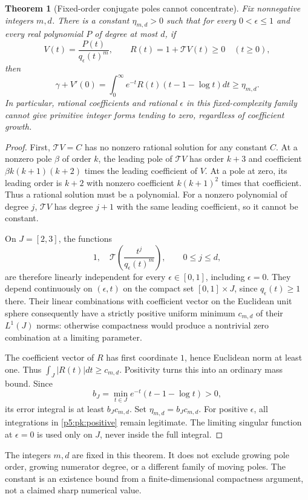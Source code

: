 \documentclass[11pt,a4paper]{article}
\newtheorem{theorem}{Theorem}[section]
\theoremstyle{definition}
\theoremstyle{remark}
\numberwithin{equation}{section}
\begin{document}
\begin{theorem}[Fixed-order conjugate poles cannot concentrate]
\label{p5:pk:fixed-moving}
Fix nonnegative integers $m,d$. There is a constant $\eta_{m,d}>0$
such that for every $0<\epsilon\le1$ and every real polynomial $P$
of degree at most $d$, if
\[
 V(t)=\frac{P(t)}{q_\epsilon(t)^m},\qquad
 R(t)=1+\mathcal T V(t)\ge0\quad(t\ge0),
\]
then
\[
 \gamma+V'(0)
 =\int_0^\infty e^{-t}R(t)(t-1-\log t)dt\ge\eta_{m,d}.
\]
In particular, rational coefficients and rational $\epsilon$ in this
fixed-complexity family cannot give primitive integer forms tending to
zero, regardless of coefficient growth.
\end{theorem}
\begin{proof}
First, $\mathcal T V=C$ has no nonzero rational solution for any constant
$C$. At a nonzero pole $\beta$ of order $k$, the leading pole of
$\mathcal T V$ has order $k+3$ and coefficient
$\beta k(k+1)(k+2)$ times the leading coefficient of $V$. At a pole at
zero, its leading order is $k+2$ with nonzero coefficient
$k(k+1)^2$ times that coefficient. Thus a rational solution must be a
polynomial. For a nonzero polynomial of degree $j$, $\mathcal T V$ has
degree $j+1$ with the same leading coefficient, so it cannot be constant.

On $J=[2,3]$, the functions
\[
 1,\quad \mathcal T\left(\frac{t^j}{q_\epsilon(t)^m}\right),
       \qquad 0\le j\le d,
\]
are therefore linearly independent for every $\epsilon\in[0,1]$,
including $\epsilon=0$. They depend continuously on $(\epsilon,t)$
on the compact set $[0,1]\times J$, since $q_\epsilon(t)\ge1$ there.
Their linear combinations with coefficient vector on the Euclidean unit
sphere consequently have a strictly positive uniform minimum $c_{m,d}$
of their $L^1(J)$ norms: otherwise compactness would produce a nontrivial
zero combination at a limiting parameter.

The coefficient vector of $R$ has first coordinate $1$, hence Euclidean
norm at least one. Thus $\int_J|R(t)|dt\ge c_{m,d}$. Positivity turns this
into an ordinary mass bound. Since
\[
 b_J=\min_{t\in J}e^{-t}(t-1-\log t)>0,
\]
its error integral is at least $b_Jc_{m,d}$. Set
$\eta_{m,d}=b_Jc_{m,d}$. For positive $\epsilon$, all integrations in
\eqref{p5:pk:positive} remain legitimate. The limiting singular function
at $\epsilon=0$ is used only on $J$, never inside the full integral.
\end{proof}
The integers $m,d$ are fixed in this theorem. It does not exclude growing
pole order, growing numerator degree, or a different family of moving
poles. The constant is an existence bound from a finite-dimensional
compactness argument, not a claimed sharp numerical value.
\end{document}
